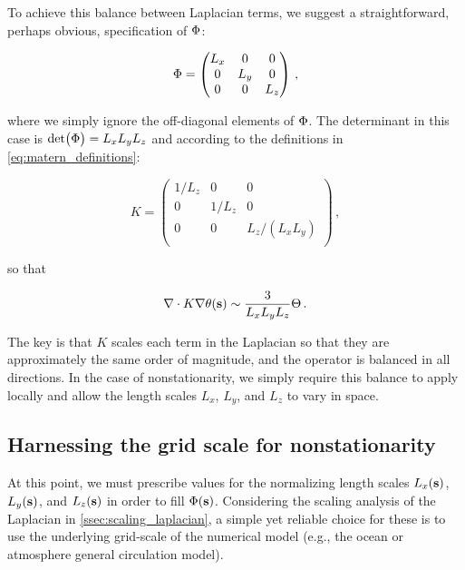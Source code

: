 To achieve this balance between Laplacian terms, we suggest a straightforward,
perhaps obvious, specification of $\Phi$:
\begin{linenomath*}\begin{equation*}
    \Phi =
        \begin{pmatrix}
            L_x & 0 & 0     \\
            0 & L_y & 0     \\
            0 & 0   & L_z   \\
        \end{pmatrix} \, ,
\end{equation*}\end{linenomath*}
where we simply ignore the off-diagonal elements of $\Phi$.
The determinant in this case is $\text{det}\big(\Phi\big) = L_xL_yL_z$ and
according to the definitions in \cref{eq:matern_definitions}:
\begin{linenomath*}\begin{equation*}
    K =
        \begin{pmatrix}
            1/L_z & 0 & 0     \\
            0 & 1/L_z & 0     \\
            0 & 0   & L_z/(L_xL_y)   \\
        \end{pmatrix} \, ,
\end{equation*}\end{linenomath*}
so that
\begin{linenomath*}\begin{equation*}
    \nabla\cdot K\nabla\theta(\mathbf{s}) \sim \dfrac{3}{L_xL_yL_z}\Theta \, .
\end{equation*}\end{linenomath*}
The key is that $K$ scales each term in the Laplacian so that they are
approximately the same order of magnitude, and the operator is balanced in all
directions.
In the case of nonstationarity, we simply require this balance to apply locally
and allow the length scales $L_x$, $L_y$, and $L_z$ to vary in space.


\subsection{Harnessing the grid scale for nonstationarity}
\label{ssec:nonstationarity}

At this point, we must prescribe values for the normalizing length scales
$L_x(\mathbf{s})$, $L_y(\mathbf{s})$, and $L_z(\mathbf{s})$ in order to fill $\Phi(\mathbf{s})$.
Considering the scaling analysis of the Laplacian in
\cref{ssec:scaling_laplacian}, a simple yet reliable choice for these
is to use the underlying grid-scale of the numerical model (e.g., the ocean or
atmosphere general circulation model).

